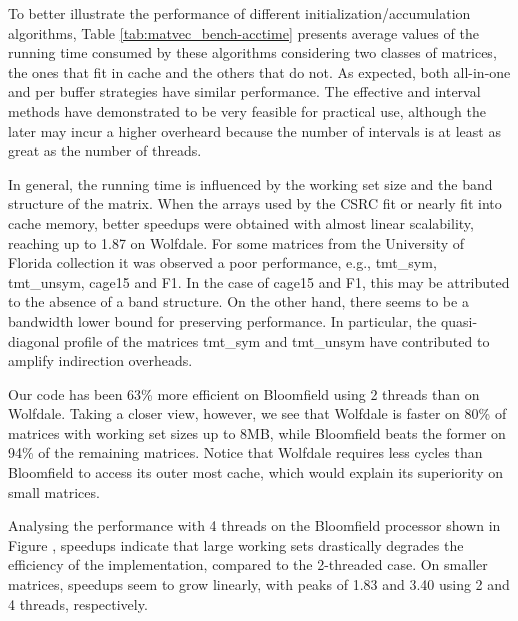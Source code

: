 \documentclass[11pt]{article}
\begin{document}
To better illustrate the performance of different initialization/accumulation algorithms, Table \ref{tab:matvec_bench-acctime} presents average values of the running time consumed by these algorithms considering two classes of matrices, the ones that fit in cache and the others that do not.
As expected, both all-in-one and per buffer strategies have similar performance.
The effective and interval methods have demonstrated to be very feasible for practical use, although the later may incur a higher overheard because the number of intervals is at least as great as the number of threads.

In general, the running time is influenced by the working set size
and the band structure of the matrix.  When the arrays used by the CSRC
fit or nearly fit into cache memory, better speedups were
obtained with almost linear scalability, reaching up to 1.87 on Wolfdale.  For some matrices
from the University of Florida collection it was observed a poor
performance, e.g., tmt\_sym, tmt\_unsym, cage15 and F1.  In the case of cage15 and F1, this may be attributed to the
absence of a band structure.  On
the other hand, there seems to be a bandwidth lower bound for preserving performance.
In particular, the quasi-diagonal profile of the matrices tmt\_sym and tmt\_unsym
have contributed to amplify indirection overheads.

Our code has been 63\% more efficient on Bloomfield using 2 threads than on Wolfdale.
Taking a closer view, however, we see that Wolfdale is faster on 80\% of matrices with working set sizes up to 8MB, while Bloomfield beats the former on 94\% of the remaining matrices.
Notice that Wolfdale requires less cycles than Bloomfield to access its outer most cache, which would explain its superiority on small matrices.

Analysing the performance with 4 threads on the Bloomfield processor shown in Figure , speedups indicate that large working sets drastically degrades the efficiency of the implementation, compared to the 2-threaded case.
On smaller matrices, speedups seem to grow linearly, with peaks of 1.83 and 3.40 using 2 and 4 threads, respectively.
\end{document}
